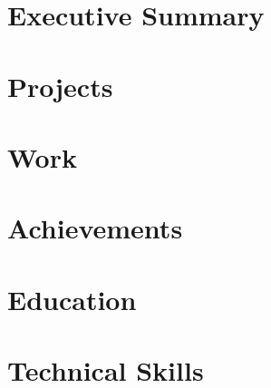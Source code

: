 \documentclass[12pt, a4paper, serif, obeyspaces, unicode]{moderncv}
\begin{document}
\maketitle

\vspace{0.5cm}

\section{Executive Summary}


\section{Projects}


\section{Work}


\section{Achievements}


\section{Education}


\section{Technical Skills}

\end{document}
